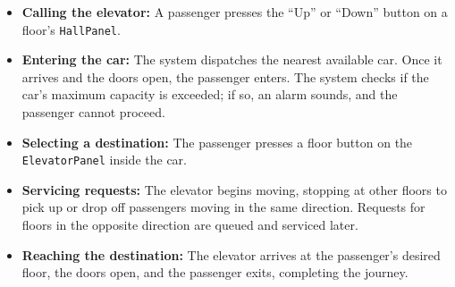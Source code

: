 \begin{itemize}
\item
\protect{}\label{B951jrFw5GnLgYtWTiF80}
\textbf{Calling the elevator:} A passenger presses the ``Up'' or ``Down'' button on a floor's \texttt{HallPanel}.
\item
\protect{}\label{dDk-7f4_plchvdS7SizBA}
\textbf{Entering the car:} The system dispatches the nearest available car. Once it arrives and the doors open, the passenger enters. The system checks if the car's maximum capacity is exceeded; if so, an alarm sounds, and the passenger cannot proceed.
\item
\protect{}\label{m41tIE5MLdeanNE4WEk8Y}
\textbf{Selecting a destination:} The passenger presses a floor button on the \texttt{ElevatorPanel} inside the car.
\item
\protect{}\label{FTQtWQRiHD_bK_0E6aD6B}
\textbf{Servicing requests:} The elevator begins moving, stopping at other floors to pick up or drop off passengers moving in the same direction. Requests for floors in the opposite direction are queued and serviced later.
\item
\protect{}\label{fXDkvQlG6wGxRPFHvs1fP}
\textbf{Reaching the destination:} The elevator arrives at the passenger's desired floor, the doors open, and the passenger exits, completing the journey.
\end{itemize}

